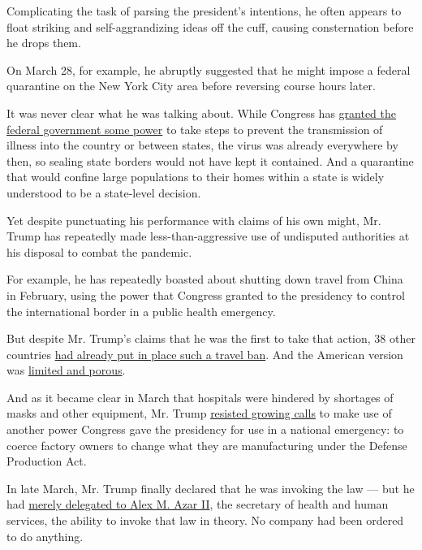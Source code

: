 Complicating the task of parsing the president's intentions, he often
appears to float striking and self-aggrandizing ideas off the cuff,
causing consternation before he drops them.

On March 28, for example, he abruptly suggested that he might impose a
federal quarantine on the New York City area before reversing course
hours later.

It was never clear what he was talking about. While Congress has
\href{https://www.law.cornell.edu/uscode/text/42/264}{granted the
federal government some power} to take steps to prevent the transmission
of illness into the country or between states, the virus was already
everywhere by then, so sealing state borders would not have kept it
contained. And a quarantine that would confine large populations to
their homes within a state is widely understood to be a state-level
decision.

Yet despite punctuating his performance with claims of his own might,
Mr. Trump has repeatedly made less-than-aggressive use of undisputed
authorities at his disposal to combat the pandemic.

For example, he has repeatedly boasted about shutting down travel from
China in February, using the power that Congress granted to the
presidency to control the international border in a public health
emergency.

But despite Mr. Trump's claims that he was the first to take that
action, 38 other countries
\href{https://www.washingtonpost.com/politics/2020/04/07/trumps-claim-that-he-imposed-first-china-ban/}{had
already put in place such a travel ban}. And the American version was
\href{https://www.nytimes3xbfgragh.onion/2020/04/04/us/coronavirus-china-travel-restrictions.html}{limited
and porous}.

And as it became clear in March that hospitals were hindered by
shortages of masks and other equipment, Mr. Trump
\href{https://www.nytimes3xbfgragh.onion/2020/03/20/us/politics/trump-coronavirus-supplies.html}{resisted
growing calls} to make use of another power Congress gave the presidency
for use in a national emergency: to coerce factory owners to change what
they are manufacturing under the Defense Production Act.

In late March, Mr. Trump finally declared that he was invoking the law
--- but he had
\href{https://www.nytimes3xbfgragh.onion/2020/03/20/us/politics/defense-production-act-virus.html}{merely
delegated to Alex M. Azar II}, the secretary of health and human
services, the ability to invoke that law in theory. No company had been
ordered to do anything.

